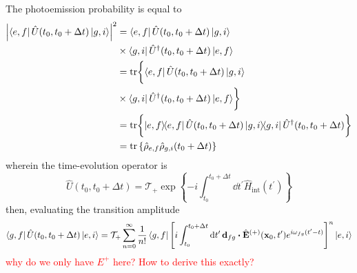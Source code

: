 The photoemission probability is equal to
\begin{equation}
	\begin{split}
		\abs{\bra{e,f}\hat{U}(t_0,t_0+\Delta t)\ket{g,i}}^2
		&=
		\bra{e,f}
		\hat{U}(t_0,t_0+\Delta t)
		\ket{g,i}
		\\
		&\times
		\bra{g,i}
		\hat{U}^\dagger(t_0,t_0+\Delta t)
		\ket{e,f}
		\\
		&=
		\tr\biggl\{
			\bra{e,f}
			\hat{U}(t_0,t_0+\Delta t)
			\ket{g,i}
			\\
			&\times
			\bra{g,i}
			\hat{U}^\dagger(t_0,t_0+\Delta t)
			\ket{e,f}
		\biggr\}
		\\
		&=
		\tr\biggl\{
			\ketbra{e,f}
			\hat{U}(t_0,t_0+\Delta t)
			\ketbra{g,i}
			\hat{U}^\dagger(t_0,t_0+\Delta t)
		\biggr\}
		\\
		&=
		\tr\left\{
			\hat\rho_{e,f}
			\hat\rho_{g,i}(t_0+\Delta t)
		\right\}
	\end{split}
\end{equation}
wherein the time-evolution operator is
\begin{equation}
	\hat{U}(t_0,t_0+\Delta t)
	=
	\mathcal{T}_+
	\exp\left\{
		-i
		\int_{t_0}^{t_0+\Delta t}\dd{t^\prime}
		\hat{H}_\text{int}(t^\prime)
	\right\}
\end{equation}
then, evaluating the transition amplitude
\begin{equation}
	\bra{g,f}
	\hat{U}(t_0,t_0+\Delta t)
	\ket{e,i}
	=
	\mathcal{T}_+
	\sum_{n=0}^\infty
	\frac{1}{n!}
	\bra{g,f}
	\left[
		i
		\int_{t_0}^{t_0+\Delta t}\dd{t^\prime}
		\vb{d}_{fg}
		\vdot
		\hat{\vb{E}}^{(+)}(\vb{x}_0,t^\prime)
		e^{i\omega_{fg}(t^\prime-t)}
	\right]^n
	\ket{e,i}
\end{equation}
\textcolor{red}{why do we only have $E^+$ here? How to derive this exactly?}